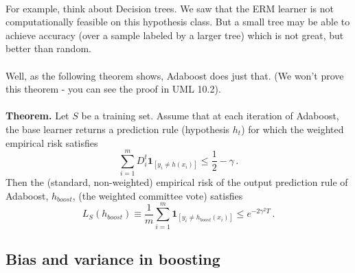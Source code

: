 ~\\
For example, think about Decision trees. We saw that the ERM learner is not
computationally feasible on this hypothesis class. But a small tree may be able
to achieve accuracy (over a sample labeled by a larger tree)
which is not great, but better than random.
\\~\\
Well, as the following theorem shows, Adaboost does just that. (We won't prove
this theorem - you can see the proof in UML 10.2).
\\~\\
{\bf Theorem.} Let $S$ be a training set. 
Assume that at each iteration of
Adaboost, the base learner returns a prediction rule (hypothesis $h_t$) for which the
weighted empirical risk satisfies
\[
  \sum_{i=1}^m D^{t}_i\mathbf{1}_{[y_i \neq h(x_i)]} \leq \frac{1}{2}-\gamma\,.
\]
Then the (standard, non-weighted) 
empirical risk of the output prediction rule of Adaboost,
$h_{boost}$, (the weighted committee
vote) satisfies
\[
  L_S(h_{boost}) \equiv \frac{1}{m}\sum_{i=1}^m \mathbf{1}_{[y_i 
  \neq h_{boost}(x_i)]} \leq e^{-2\gamma^2 T }\,.
\]

%
%


%
\subsection{Bias and variance in boosting}

